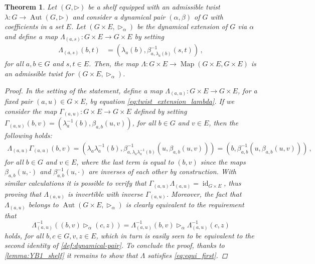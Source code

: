 \documentclass[preprint,1p]{elsarticle}
\numberwithin{equation}{section}
\newtheorem{theor}{Theorem}[section]
\theoremstyle{definition}               %
\newcommand{\tr}{\triangleright}
\DeclareMathOperator{\Aut}{Aut}
\DeclareMathOperator{\Map}{Map}
\DeclareMathOperator{\id}{id}
\begin{document}
\begin{theor}\label{theor:twist_extension}
    Let $(G,\tr)$ be a shelf equipped with an admissible twist {$\lambda:G \to \Aut(G,\triangleright)$} and consider a dynamical pair $(\alpha,\beta)$ of $G$ with coefficients in a set $E$.
    Let $(G \times E,\tr_\alpha)$ be the dynamical extension of $G$ via $\alpha$ and define a map {$\Lambda_{(a,s)}:G\times E\to G\times E$} by setting 
    \begin{align}\label{eq:twist_extension_lambda}
        {\Lambda}_{(a,s)}(b,t) &= \left(\lambda_a(b), \beta^{-1}_{a,\lambda_a(b)}(s,t)\right) \,,
    \end{align}
    for all $a,b \in G$ and $s,t \in E$.
    Then, the map {$\Lambda:G \times E \to \Map(G \times E, G \times E)$} is an admissible twist for $(G \times E,\tr_\alpha)$.
    \begin{proof}
    In the setting of the statement, define a map ${\Lambda_{(a,u)}}:G \times E \to G \times E$, for a fixed pair $(a,u) \in G \times E$, by equation \eqref{eq:twist_extension_lambda}.
    {If we consider the map $\Gamma_{(a,u)}:G \times E \to G \times E$ defined by setting $\Gamma_{(a,u)}(b,v) = \left(\lambda^{-1}_a(b),\beta_{a,b}(u,v)\right)$, for all $b \in G$ and $v \in E$, then the following holds:
    \begin{align*}
        \Lambda_{(a,u)}\Gamma_{(a,u)}(b,v) 
        =
        \left(\lambda_a\lambda_a^{-1}(b),\beta^{-1}_{a,\lambda_a\lambda_a^{-1}(b)}\left(u,\beta_{a,b}(u,v)\right)\right) 
        =
        \left(b,\beta^{-1}_{a,b}\left(u,\beta_{a,b}(u,v)\right)\right) \,,
    \end{align*}
    for all $b \in G$ and $v \in E$, where the last term is equal to $(b,v)$ since the maps $\beta_{a,b}(u,\boldsymbol{\cdot})$ and $\beta^{-1}_{a,b}(u,\boldsymbol{\cdot})$ are inverses of each other by construction.
    With similar calculations it is possible to verify that $\Gamma_{(a,u)}\Lambda_{(a,u)} = \id_{G \times E}$, thus proving that $\Lambda_{(a,u)}$ is invertible with inverse $\Gamma_{(a,u)}$.}
    Moreover, the fact that  ${\Lambda}_{(a,u)} $ belongs to {$\Aut(G\times E,\tr_\alpha)$} is clearly equivalent {to the requirement that} 
    \[
        {\Lambda^{-1}_{(a,u)}}\left((b,v) \tr_\alpha (c,z)\right) 
        = {\Lambda^{-1}_{(a,u)}}(b,v) \tr_\alpha {\Lambda^{-1}_{(a,u)}}(c,z)
    \]
    holds, for all $b,c \in G, v,z \in E$, which in turn is easily seen to be equivalent to the second identity of {\cref{def:dynamical-pair}}.
    To conclude the proof, thanks to \cref{lemma:YB1_shelf} it remains to show that ${\Lambda}$ satisfies \eqref{eq:equi_first}.

\end{proof}
\end{theor}
\end{document}
